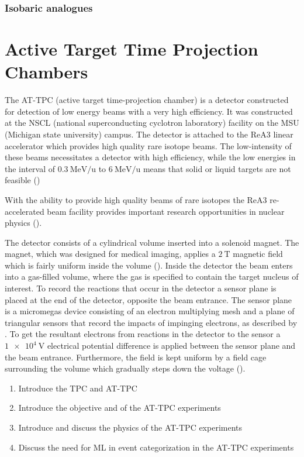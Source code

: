 \subsubsection{Isobaric analogues}

\section{Active Target Time Projection Chambers}\label{sec:attpc}

The AT-TPC (active target time-projection chamber) is a detector constructed for detection of low energy beams with a very high efficiency. It was constructed at the NSCL (national superconducting cyclotron laboratory) facility on the MSU (Michigan state university) campus. The detector is attached to the ReA3 linear accelerator which provides high quality rare isotope beams. The low-intensity of these beams necessitates a detector with high efficiency, while the low energies in the interval of $\SI[per-mode=symbol]{0.3}{\MeV \per \atomicmassunit}$ to $\SI[per-mode=symbol]{6}{\MeV \per \atomicmassunit}$ means that solid or liquid targets are not feasible (\cite{Bradt2017a})

 With the ability to provide high quality beams of rare isotopes the ReA3 re-accelerated beam facility  provides important research opportunities in nuclear physics (\cite{Kester2010}). 

 The detector consists of a cylindrical volume inserted into a solenoid magnet. The magnet, which was designed for medical imaging, applies a $\SI{2}{\tesla}$ magnetic field which is fairly uniform inside the volume (\cite{Bradt2017a}). Inside the detector the beam enters into a gas-filled volume, where the gas is specified to contain the target nucleus of interest. To record the reactions that occur in the detector a sensor plane is placed at the end of the detector, opposite the beam entrance. The sensor plane is a micromegas device consisting of an electron multiplying mesh and a plane of triangular sensors that record the impacts of impinging electrons, as described by \citet{Giomataris1996}. To get the resultant electrons from reactions in the detector to the sensor a $\SI{1e4}{\volt}$ electrical potential difference is applied between the sensor plane and the beam entrance. Furthermore, the field is kept uniform by a field cage surrounding the volume which gradually steps down the voltage (\cite{Bradt2017a}).




\begin{enumerate}
	\item Introduce the TPC and AT-TPC
	\item Introduce the objective and of the AT-TPC experiments
	\item Introduce and discuss the physics of the AT-TPC experiments 
	\item Discuss the need for ML in event categorization in the AT-TPC experiments 
\end{enumerate}